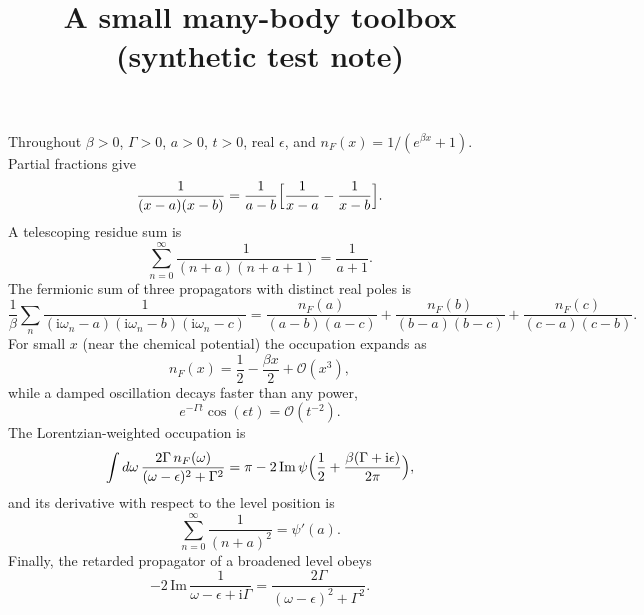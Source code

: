 \documentclass{article}
\title{A small many-body toolbox (synthetic test note)}
\newcommand{\ii}{\mathrm{i}}
\begin{document}
\maketitle
Throughout $\beta>0$, $\Gamma>0$, $a>0$, $t>0$, real $\epsilon$, and $n_F(x)=1/(e^{\beta x}+1)$.
Partial fractions give
\begin{equation}\label{eq:pf}
\frac{1}{(x-a)(x-b)} = \frac{1}{a-b}\Bigl[\frac{1}{x-a}-\frac{1}{x-b}\Bigr].
\end{equation}
A telescoping residue sum is
\begin{equation}\label{eq:telescope}
\sum_{n=0}^{\infty}\frac{1}{(n+a)(n+a+1)} = \frac{1}{a+1}.
\end{equation}
The fermionic sum of three propagators with distinct real poles is
\begin{equation}\label{eq:triple}
\frac{1}{\beta}\sum_n \frac{1}{(\ii\omega_n-a)(\ii\omega_n-b)(\ii\omega_n-c)}
 = \frac{n_F(a)}{(a-b)(a-c)}+\frac{n_F(b)}{(b-a)(b-c)}+\frac{n_F(c)}{(c-a)(c-b)}.
\end{equation}
For small $x$ (near the chemical potential) the occupation expands as
\begin{equation}\label{eq:small}
n_F(x) = \frac12 - \frac{\beta x}{2} + \mathcal{O}(x^{3}),
\end{equation}
while a damped oscillation decays faster than any power,
\begin{equation}\label{eq:decay}
e^{-\Gamma t}\cos(\epsilon t) = \mathcal{O}(t^{-2}).
\end{equation}
The Lorentzian-weighted occupation is
\begin{equation}\label{eq:lorentz}
\int d\omega\,\frac{2\Gamma\, n_F(\omega)}{(\omega-\epsilon)^2+\Gamma^2}
 = \pi - 2\,\mathrm{Im}\,\psi\Bigl(\frac12+\frac{\beta(\Gamma+\ii\epsilon)}{2\pi}\Bigr),
\end{equation}
and its derivative with respect to the level position is
\begin{equation}\label{eq:trigamma}
\sum_{n=0}^{\infty}\frac{1}{(n+a)^2} = \psi'(a).
\end{equation}
Finally, the retarded propagator of a broadened level obeys
\begin{equation}\label{eq:spectral}
-2\,\mathrm{Im}\,\frac{1}{\omega-\epsilon+\ii\Gamma} = \frac{2\Gamma}{(\omega-\epsilon)^2+\Gamma^2}.
\end{equation}
\end{document}
